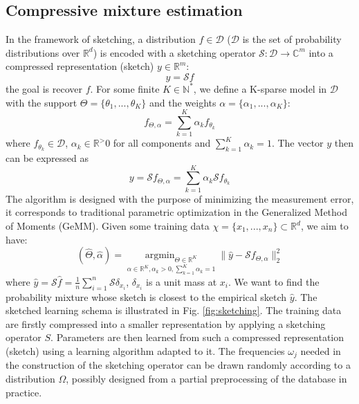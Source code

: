 \documentclass[12pt,a4paper]{article}
\DeclareMathOperator*{\argmin}{argmin}
\begin{document}
\subsection{Compressive mixture estimation}
In the framework of sketching, a distribution $f\in \mathcal{D}$ ($\mathcal{D}$ is the set of probability distributions over $\mathbb{R}^d$) is encoded with a sketching operator $\mathcal{S}: \mathcal{D} \xrightarrow{} \mathbb{C}^m$ into a compressed representation (sketch) $y \in \mathbb{R}^m$:
\begin{equation}
    y = \mathcal{S}f
\end{equation}
the goal is recover $f$. For some finite $K \in \mathbb{N}^*$, we define a K\hyp{}sparse model in $ \mathcal{D} $ with the support $\Theta = \{\theta_1,...,\theta_K\}$ and the weights $\alpha = \{\alpha_1,...,\alpha_K\}$:
\begin{equation}
    f_{\Theta, \alpha} = \sum_{k=1}^K \alpha_k f_{\theta_k}
\end{equation}
where $f_{\theta_k} \in \mathcal{D}$, $\alpha_k \in \mathbb{R}^> 0$ for all components and $\sum_{k=1}^K \alpha_k = 1$. The vector $y$ then can be expressed as 
\begin{equation}
    y = \mathcal{S}f_{\Theta, \alpha} = \sum_{k=1}^K \alpha_k \mathcal{S} f_{\theta_k}
\end{equation}
The algorithm is designed with the purpose of minimizing the measurement error, it corresponds to traditional parametric optimization in the Generalized Method of Moments (GeMM). Given some training data $\chi =\{x_1,...,x_n\} \subset \mathbb{R}^d$, we aim to have:
\begin{equation}\label{eq:sk}
    (\hat{\Theta}, \hat{\alpha}) = \underset{\alpha \in \mathbb{R} ^K, \alpha_k > 0, \sum_{k=1}^K\alpha_k =1}{\argmin_{\Theta \in \mathbb{R} ^K}} \| \hat{y} -\mathcal{S}f_{\Theta, \alpha}\|^2_2
\end{equation}
where $\hat{y} = \mathcal{S}\hat{f}= \frac{1}{n}\sum_{i =1}^n \mathcal{S} \delta_{x_i}$, $ \delta_{x_i}$ is a unit mass at $x_i$.
We want to find the probability mixture whose sketch is closest to the empirical sketch $\hat{y}$.
The sketched learning schema is illustrated in Fig. \ref{fig:sketching}.
The training data are firstly compressed into a smaller representation by applying a sketching operator $S$.
Parameters are then learned from such a compressed representation (sketch) using a learning algorithm adapted to it.
The frequencies $\omega_j$ needed in the construction of the sketching operator can be drawn randomly according to a distribution $\Omega$, possibly designed from a partial preprocessing of the database in practice.
\end{document}
